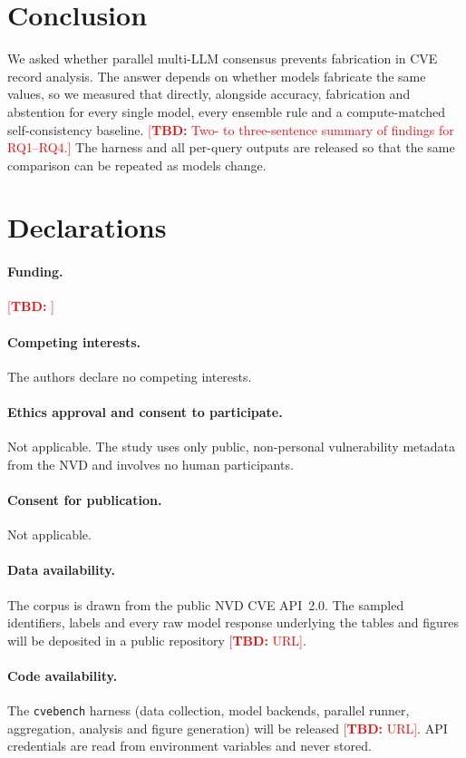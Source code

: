 \documentclass[11pt]{article}
\newcommand{\TBD}[1]{\textcolor{red}{[\textbf{TBD:} #1]}}
\begin{document}
\section{Conclusion}\label{sec:conclusion}
We asked whether parallel multi-LLM consensus prevents fabrication in CVE record analysis. The answer depends on whether models fabricate the same values, so we measured that directly, alongside accuracy, fabrication and abstention for every single model, every ensemble rule and a compute-matched self-consistency baseline. \TBD{Two- to three-sentence summary of findings for RQ1--RQ4.} The harness and all per-query outputs are released so that the same comparison can be repeated as models change.

\section*{Declarations}
\paragraph{Funding.} \TBD{}
\paragraph{Competing interests.} The authors declare no competing interests.
\paragraph{Ethics approval and consent to participate.} Not applicable. The study uses only public, non-personal vulnerability metadata from the NVD and involves no human participants.
\paragraph{Consent for publication.} Not applicable.
\paragraph{Data availability.} The corpus is drawn from the public NVD CVE API~2.0. The sampled identifiers, labels and every raw model response underlying the tables and figures will be deposited in a public repository \TBD{URL}.
\paragraph{Code availability.} The \texttt{cvebench} harness (data collection, model backends, parallel runner, aggregation, analysis and figure generation) will be released \TBD{URL}. API credentials are read from environment variables and never stored.
\end{document}
